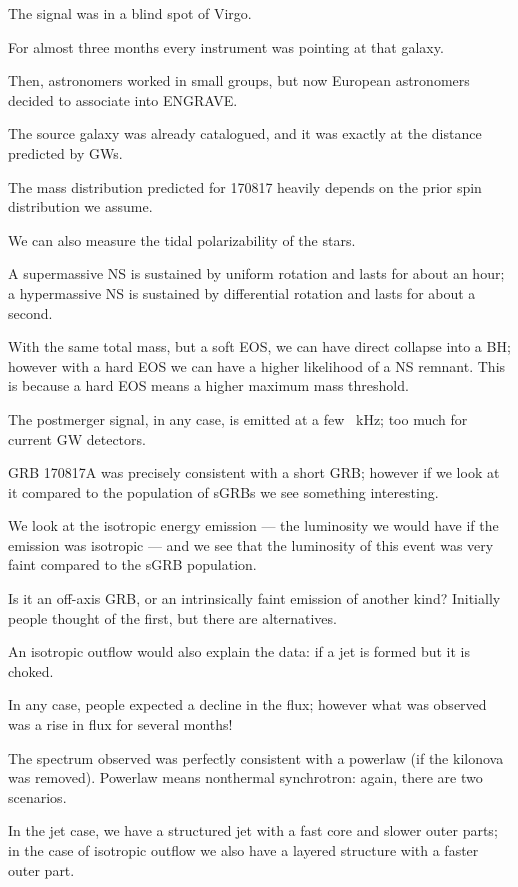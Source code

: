 \documentclass[main.tex]{subfiles}
\begin{document}
The signal was in a blind spot of Virgo. 

For almost three months every instrument was pointing at that galaxy. 

Then, astronomers worked in small groups, but 
now European astronomers decided to associate into ENGRAVE. 

The source galaxy was already catalogued, and it was exactly at the 
distance predicted by GWs. 

The mass distribution predicted for 170817 heavily depends 
on the prior spin distribution we assume.  

We can also measure the tidal polarizability of the stars. 

A supermassive NS is sustained by uniform rotation and lasts for about an hour;
a hypermassive NS is sustained by differential rotation and lasts for about a second.

With the same total mass, but a soft EOS, we can have direct collapse into a BH; 
however with a hard EOS we can have a higher likelihood of a NS remnant. 
This is because a hard EOS means a higher maximum mass threshold. 

The postmerger signal, in any case, is emitted at a few \SI{}{kHz}; 
too much for current GW detectors. 

GRB 170817A was precisely consistent with a short GRB; however if we look 
at it compared to the population of sGRBs we see something interesting.

We look at the isotropic energy emission --- the luminosity we would have 
if the emission was isotropic --- 
and we see that the luminosity of this event was very faint compared 
to the sGRB population. 

Is it an off-axis GRB, or an intrinsically faint emission of another kind? 
Initially people thought of the first, but there are alternatives. 

An isotropic outflow would also explain the data: if a jet is formed but it is choked. 

In any case, people expected a decline in the flux; however 
what was observed was a rise in flux for several months! 

The spectrum observed was perfectly consistent with a powerlaw (if the kilonova was removed). 
Powerlaw means nonthermal synchrotron: again, there are two scenarios. 

In the jet case, we have a structured jet with a fast core and slower outer parts; 
in the case of isotropic outflow we also have a layered structure with a faster outer part. 
\end{document}
